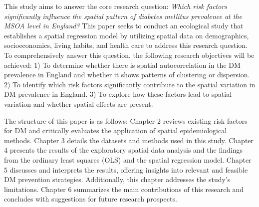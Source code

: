 This study aims to answer the core research question: \textit{Which risk factors significantly influence the spatial pattern of diabetes mellitus prevalence at the MSOA level in England?} This paper seeks to conduct an ecological study that establishes a spatial regression model by utilizing spatial data on demographics, socioeconomics, living habits, and health care to address this research question. To comprehensively answer this question, the following research objectives will be achieved: 1) To determine whether there is spatial autocorrelation in the DM prevalence in England and whether it shows patterns of clustering or dispersion. 2) To identify which risk factors significantly contribute to the spatial variation in DM prevalence in England. 3) To explore how these factors lead to spatial variation and whether spatial effects are present.

The structure of this paper is as follows: Chapter 2 reviews existing risk factors for DM and critically evaluates the application of spatial epidemiological methods. Chapter 3 details the datasets and methods used in this study. Chapter 4 presents the results of the exploratory spatial data analysis and the findings from the ordinary least squares (OLS) and the spatial regression model. Chapter 5 discusses and interprets the results, offering insights into relevant and feasible DM prevention strategies. Additionally, this chapter addresses the study’s limitations. Chapter 6 summarizes the main contributions of this research and concludes with suggestions for future research prospects.
